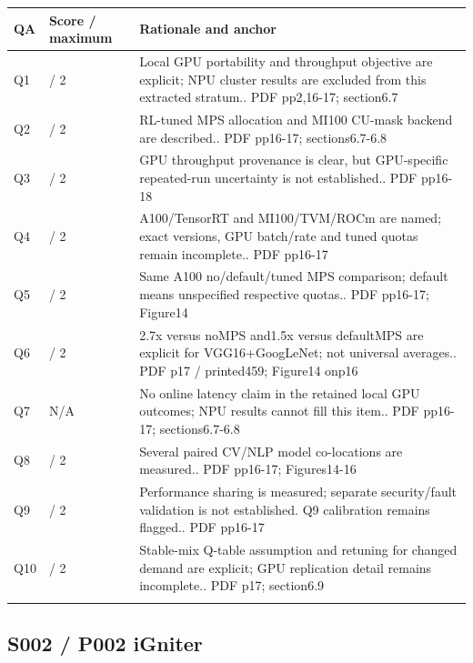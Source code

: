 \begin{longtable}{>{\raggedright\arraybackslash}p{}>{\raggedright\arraybackslash}p{}>{\raggedright\arraybackslash}p{}}
\toprule
\textbf{QA} & \textbf{Score / maximum} & \textbf{Rationale and anchor}\\\midrule\endhead
Q1 & 2 / 2 & Local GPU portability and throughput objective are explicit; NPU cluster results are excluded from this extracted stratum.. PDF pp2,16-17; section6.7\\\addlinespace
Q2 & 2 / 2 & RL-tuned MPS allocation and MI100 CU-mask backend are described.. PDF pp16-17; sections6.7-6.8\\\addlinespace
Q3 & 1 / 2 & GPU throughput provenance is clear, but GPU-specific repeated-run uncertainty is not established.. PDF pp16-18\\\addlinespace
Q4 & 1 / 2 & A100/TensorRT and MI100/TVM/ROCm are named; exact versions, GPU batch/rate and tuned quotas remain incomplete.. PDF pp16-17\\\addlinespace
Q5 & 1 / 2 & Same A100 no/default/tuned MPS comparison; default means unspecified respective quotas.. PDF pp16-17; Figure14\\\addlinespace
Q6 & 2 / 2 & 2.7x versus noMPS and1.5x versus defaultMPS are explicit for VGG16+GoogLeNet; not universal averages.. PDF p17 / printed459; Figure14 onp16\\\addlinespace
Q7 & N/A & No online latency claim in the retained local GPU outcomes; NPU results cannot fill this item.. PDF pp16-17; sections6.7-6.8\\\addlinespace
Q8 & 2 / 2 & Several paired CV/NLP model co-locations are measured.. PDF pp16-17; Figures14-16\\\addlinespace
Q9 & 1 / 2 & Performance sharing is measured; separate security/fault validation is not established. Q9 calibration remains flagged.. PDF pp16-17\\\addlinespace
Q10 & 1 / 2 & Stable-mix Q-table assumption and retuning for changed demand are explicit; GPU replication detail remains incomplete.. PDF p17; section6.9\\\addlinespace
\bottomrule\end{longtable}

\clearpage\subsection{S002 / P002 iGniter}

\cite{P002}


